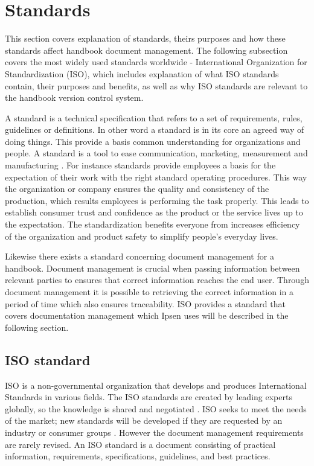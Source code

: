 \section{Standards}
This section covers explanation of standards, theirs purposes and how these standards affect handbook document management. The following subsection covers the most widely used standards worldwide - International Organization for Standardization (ISO)\cite{ISOworldwidemostused}, which includes explanation of what ISO standards contain, their purposes and benefits, as well as why ISO standards are relevant to the handbook version control system.

A standard is a technical specification that refers to a set of requirements, rules, guidelines or definitions\citep[p.~5]{Standard}. In other word a standard is in its core an agreed way of doing things. This provide a basis common understanding for organizations and people.  A standard is a tool to ease communication, marketing, measurement and manufacturing \cite{Standardtool}. For instance standards provide employees a basis for the expectation of their work with the right standard operating procedures. This way the organization or company ensures the quality and consistency of the production, which results employees is performing the task properly. 
This leads to establish consumer trust and confidence as the product or the service lives up to the expectation. The standardization benefits everyone from increases efficiency of the organization and product safety to simplify people's everyday lives\citep[p.~83]{Standardization}.

Likewise there exists a standard concerning document management for a handbook. Document management is crucial when passing information between relevant parties to ensures that correct information reaches the end user. Through document management it is possible to retrieving the correct information in a period of time which also ensures traceability. ISO provides a standard that covers documentation management which Ipsen uses will be described in the following section. 

\subsection{ISO standard}
ISO is a non-governmental organization that develops and produces International Standards in various fields. The ISO standards are created by leading experts globally, so the knowledge is shared and negotiated \cite{ISOinfo}. ISO seeks to meet the needs of the market; new standards will be developed if they are requested by an industry or consumer groups \cite{ISOdeveloping}. However the document management requirements are rarely revised\cite{Ipsenfirstinterview}. An ISO standard is a document consisting of practical information, requirements, specifications, guidelines, and best practices.\cite{ISOreviewedevery5years}

